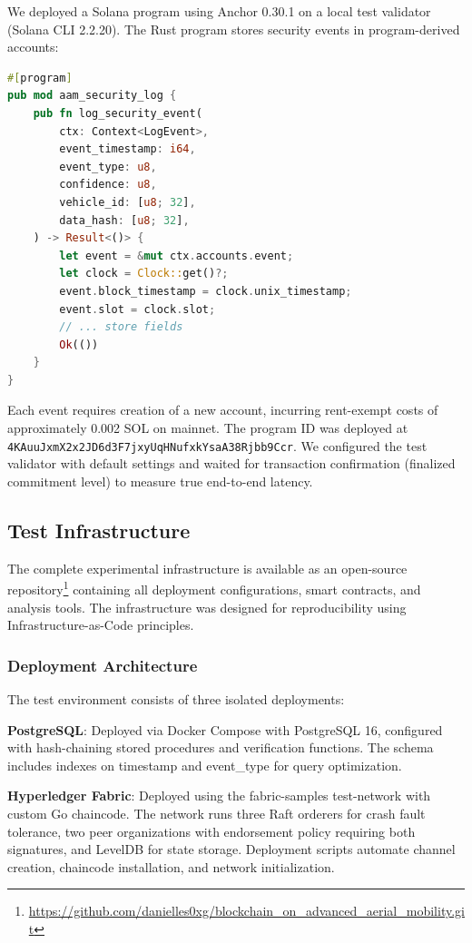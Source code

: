 \documentclass[conference]{IEEEtran}
\begin{document}
We deployed a Solana program using Anchor 0.30.1 on a local test validator (Solana CLI 2.2.20). The Rust program stores security events in program-derived accounts:

\begin{lstlisting}[language=Rust, caption={Solana Program (excerpt)}]
#[program]
pub mod aam_security_log {
    pub fn log_security_event(
        ctx: Context<LogEvent>,
        event_timestamp: i64,
        event_type: u8,
        confidence: u8,
        vehicle_id: [u8; 32],
        data_hash: [u8; 32],
    ) -> Result<()> {
        let event = &mut ctx.accounts.event;
        let clock = Clock::get()?;
        event.block_timestamp = clock.unix_timestamp;
        event.slot = clock.slot;
        // ... store fields
        Ok(())
    }
}
\end{lstlisting}

Each event requires creation of a new account, incurring rent-exempt costs of approximately 0.002 SOL on mainnet. The program ID was deployed at \texttt{4KAuuJxmX2x2JD6d3F7jxyUqHNufxkYsaA38Rjbb9Ccr}. We configured the test validator with default settings and waited for transaction confirmation (finalized commitment level) to measure true end-to-end latency.

\subsection{Test Infrastructure}

The complete experimental infrastructure is available as an open-source repository\footnote{\url{https://github.com/danielles0xg/blockchain_on_advanced_aerial_mobility.git}} containing all deployment configurations, smart contracts, and analysis tools. The infrastructure was designed for reproducibility using Infrastructure-as-Code principles.

\subsubsection{Deployment Architecture}
The test environment consists of three isolated deployments:

\textbf{PostgreSQL}: Deployed via Docker Compose with PostgreSQL 16, configured with hash-chaining stored procedures and verification functions. The schema includes indexes on timestamp and event\_type for query optimization.

\textbf{Hyperledger Fabric}: Deployed using the fabric-samples test-network with custom Go chaincode. The network runs three Raft orderers for crash fault tolerance, two peer organizations with endorsement policy requiring both signatures, and LevelDB for state storage. Deployment scripts automate channel creation, chaincode installation, and network initialization.
\end{document}
